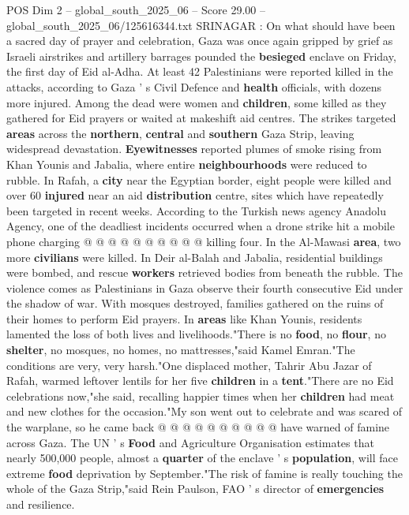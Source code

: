 \begin{textsample}{POS Dim 2 – global\_south\_2025\_06 – Score 29.00 – global\_south\_2025\_06/125616344.txt}  \label{ex:f2_pos_087}
SRINAGAR : On what should have been a sacred day of prayer and celebration, Gaza was once again gripped by grief as Israeli airstrikes and artillery barrages pounded the \textbf{besieged} enclave on Friday, the first day of Eid al-Adha.
At least 42 Palestinians were reported killed in the attacks, according to Gaza ' s Civil Defence and \textbf{health} officials, with dozens more injured.
Among the dead were women and \textbf{children}, some killed as they gathered for Eid prayers or waited at makeshift aid centres.
The strikes targeted \textbf{areas} across the \textbf{northern}, \textbf{central} and \textbf{southern} Gaza Strip, leaving widespread devastation. \textbf{Eyewitnesses} reported plumes of smoke rising from Khan Younis and Jabalia, where entire \textbf{neighbourhoods} were reduced to rubble.
In Rafah, a \textbf{city} near the Egyptian border, eight people were killed and over 60 \textbf{injured} near an aid \textbf{distribution} centre, sites which have repeatedly been targeted in recent weeks.
According to the Turkish news agency Anadolu Agency, one of the deadliest incidents occurred when a drone strike hit a mobile phone charging @ @ @ @ @ @ @ @ @ @ killing four.
In the Al-Mawasi \textbf{area}, two more \textbf{civilians} were killed.
In Deir al-Balah and Jabalia, residential buildings were bombed, and rescue \textbf{workers} retrieved bodies from beneath the rubble.
The violence comes as Palestinians in Gaza observe their fourth consecutive Eid under the shadow of war.
With mosques destroyed, families gathered on the ruins of their homes to perform Eid prayers.
In \textbf{areas} like Khan Younis, residents lamented the loss of both lives and livelihoods."There is no \textbf{food}, no \textbf{flour}, no \textbf{shelter}, no mosques, no homes, no mattresses,"said Kamel Emran."The conditions are very, very harsh."One displaced mother, Tahrir Abu Jazar of Rafah, warmed leftover lentils for her five \textbf{children} in a \textbf{tent}."There are no Eid celebrations now,"she said, recalling happier times when her \textbf{children} had meat and new clothes for the occasion."My son went out to celebrate and was scared of the warplane, so he came back @ @ @ @ @ @ @ @ @ @ have warned of famine across Gaza.
The UN ' s \textbf{Food} and Agriculture Organisation estimates that nearly 500,000 people, almost a \textbf{quarter} of the enclave ' s \textbf{population}, will face extreme \textbf{food} deprivation by September."The risk of famine is really touching the whole of the Gaza Strip,"said Rein Paulson, FAO ' s director of \textbf{emergencies} and resilience.

\end{textsample}
